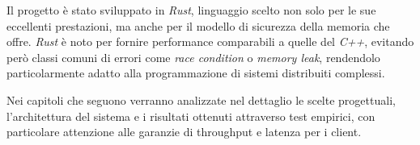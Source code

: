 Il progetto è stato sviluppato in \textit{Rust}, linguaggio scelto non solo per le sue eccellenti prestazioni, ma anche per il modello di sicurezza della memoria che offre.
\textit{Rust} è noto per fornire performance comparabili a quelle del \textit{C++}, evitando però classi comuni di errori come \textit{race condition} o \textit{memory leak}, rendendolo particolarmente adatto alla programmazione di sistemi distribuiti complessi.

Nei capitoli che seguono verranno analizzate nel dettaglio le scelte progettuali, l'architettura del sistema e i risultati ottenuti attraverso test empirici, con particolare attenzione alle garanzie di throughput e latenza per i client.
